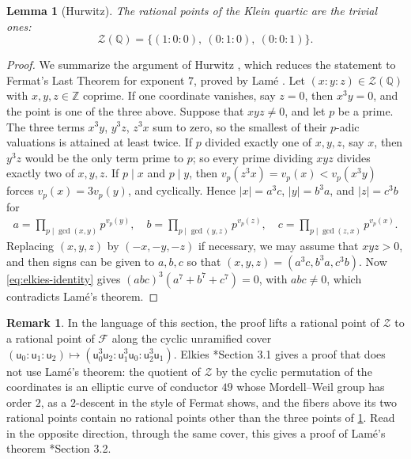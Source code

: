 \documentclass[12pt]{amsart}
\newcommand{\Q}{\mathbb{Q}}
\newcommand{\Z}{\mathbb{Z}}
\newcommand{\calF}{{\mathcal F}}
\newcommand{\calZ}{{\mathcal Z}}
\newcommand{\sfu}{\mathsf{u}}
\numberwithin{equation}{section}
\newtheorem{lemma}[theorem]{Lemma}
\theoremstyle{definition}
\newtheorem{remark}[theorem]{Remark}
\begin{document}
\begin{lemma}[Hurwitz]
  \label{lem:hurwitz}
  The rational points of the Klein quartic are the trivial ones:
  \[\calZ(\Q) = \{(1:0:0),\ (0:1:0),\ (0:0:1)\}.\]
\end{lemma}
\begin{proof}
  We summarize the argument of Hurwitz \cite{Hurwitz-08}, which reduces the
  statement to Fermat's Last Theorem for exponent $7$, proved by Lam\'e
  \cite{Lame-1840}. Let $(x:y:z) \in \calZ(\Q)$ with $x,y,z \in \Z$ coprime. If one
  coordinate vanishes, say $z = 0$, then $x^3y = 0$, and the point is one of
  the three above. Suppose that $xyz \neq 0$, and let $p$ be a prime. The three
  terms $x^3y$, $y^3z$, $z^3x$ sum to zero, so the smallest of their $p$-adic
  valuations is attained at least twice. If $p$ divided exactly one of $x,y,z$,
  say $x$, then $y^3z$ would be the only term prime to $p$; so every prime
  dividing $xyz$ divides exactly two of $x,y,z$. If $p \mid x$ and $p \mid y$, then
  $v_p(z^3x) = v_p(x) < v_p(x^3y)$ forces $v_p(x) = 3v_p(y)$, and cyclically.
  Hence $|x| = a^3c$, $|y| = b^3a$, and $|z| = c^3b$ for
  \begin{align*}
    a = \prod_{p \mid \gcd(x,y)} p^{v_p(y)},\quad b = \prod_{p \mid \gcd(y,z)} p^{v_p(z)},\quad c = \prod_{p \mid \gcd(z,x)} p^{v_p(x)}.
  \end{align*}
  Replacing $(x,y,z)$ by $(-x,-y,-z)$ if necessary, we may assume that $xyz > 0$,
  and then signs can be given to $a,b,c$ so that $(x,y,z) = (a^3c, b^3a,
  c^3b)$. Now \cref{eq:elkies-identity} gives $(abc)^3(a^7 + b^7 + c^7) = 0$,
  with $abc \neq 0$, which contradicts Lam\'e's theorem.
\end{proof}

\begin{remark}
  \label{rem:elkies-hurwitz}
  In the language of this section, the proof lifts a rational point of $\calZ$
  to a rational point of $\calF$ along the cyclic unramified cover
  $(\sfu_0:\sfu_1:\sfu_2) \mapsto (\sfu_0^3\sfu_2 : \sfu_1^3\sfu_0 :
  \sfu_2^3\sfu_1)$. Elkies \cite{Elkies-99}*{Section 3.1} gives a proof that
  does not use Lam\'e's theorem: the quotient of $\calZ$ by the cyclic
  permutation of the coordinates is an elliptic curve of conductor $49$ whose
  Mordell--Weil group has order $2$, as a $2$-descent in the style of Fermat
  shows, and the fibers above its two rational points contain no rational
  points other than the three points of \cref{lem:hurwitz}. Read in the opposite direction, through
  the same cover, this gives a proof of Lam\'e's theorem
  \cite{Elkies-99}*{Section 3.2}.
\end{remark}
\end{document}

